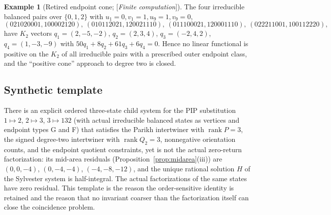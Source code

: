 \documentclass[11pt]{amsart}
\theoremstyle{plain}
\theoremstyle{definition}
\newtheorem{example}[theorem]{Example}
\theoremstyle{remark}
\newcommand{\rank}{\operatorname{rank}}
\newcommand{\Status}[1]{\textup{[\textit{#1}]}}
\begin{document}
\begin{example}[Retired endpoint cone; \Status{Finite computation}]\label{ex:cone}
The four irreducible balanced pairs over $\{0,1,2\}$ with $u_1=0,v_1=1,u_9=1,v_9=0$,
\[
(021020001,100002120),\ (010112021,120021110),\ (011100021,120001110),\ (022211001,100112220),
\]
have $K_2$ vectors $q_1=(2,-5,-2)$, $q_2=(2,3,4)$, $q_3=(-2,4,2)$, $q_4=(1,-3,-9)$ with $50q_1+8q_2+61q_3+6q_4=0$. Hence no linear functional is positive on the $K_2$ of all irreducible pairs with a prescribed outer endpoint class, and the ``positive cone'' approach to degree two is closed.
\end{example}

\subsection{Synthetic template}\label{sec:synthetic}
There is an explicit ordered three-state child system for the PIP substitution $1\mapsto2$, $2\mapsto3$, $3\mapsto132$ (with actual irreducible balanced states as vertices and endpoint types G and F) that satisfies the Parikh intertwiner with $\rank P=3$, the signed degree-two intertwiner with $\rank Q_2=3$, nonnegative orientation counts, and the endpoint quotient constraints, yet is not the actual zero-return factorization: its mid-area residuals (Proposition~\ref{prop:midarea}(iii)) are $(0,0,-4)$, $(0,-4,-4)$, $(-4,-8,-12)$, and the unique rational solution $H$ of the Sylvester system is half-integral. The actual factorizations of the same states have zero residual. This template is the reason the order-sensitive identity is retained and the reason that no invariant coarser than the factorization itself can close the coincidence problem.
\end{document}
